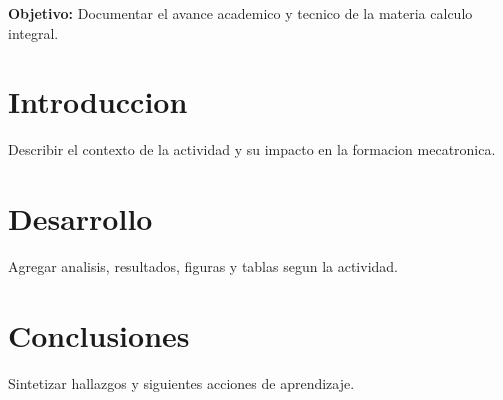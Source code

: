 \documentclass[spanish,letterpaper,oneside]{article}
\begin{document}
\templatePortrait
\templatePagecfg
\onehalfspacing

\begin{abstractd}
\textbf{Objetivo:} Documentar el avance academico y tecnico de la materia calculo integral.
\end{abstractd}

\templateIndex
\templateFinalcfg

\section{Introduccion}
Describir el contexto de la actividad y su impacto en la formacion mecatronica.

\section{Desarrollo}
Agregar analisis, resultados, figuras y tablas segun la actividad.

\section{Conclusiones}
Sintetizar hallazgos y siguientes acciones de aprendizaje.



\end{document}
